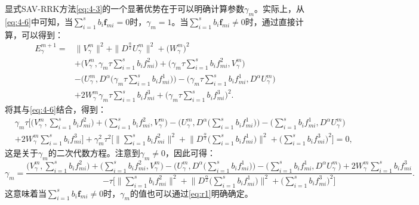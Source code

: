 显式SAV-RRK方法\eqref{eq:4-3}的一个显著优势在于可以明确计算参数$\gamma_m$。实际上，从\eqref{eq:4-6}中可知，当$\sum\limits_{i=1}^s b_i \bm{f}_{m i}=0$时，$\gamma_m=1$。当$\sum\limits_{i=1}^s b_i \bm{f}_{m i}\neq 0$时，通过直接计算，可以得到：
\begin{align}
E_{\gamma}^{m+1}  = & \|V_{\gamma}^{m}\|^2+\|D^\frac{\alpha}{2} U_{\gamma}^{m}\|^2+\big(W_{\gamma}^{m}\big)^2 \nonumber\\
& + \big(V_{\gamma}^{m},\gamma_m\tau\sum\limits_{i=1}^{s}b_if_{mi}^2\big)+\big(\gamma_m\tau\sum\limits_{i=1}^{s}b_if_{mi}^2,V_{\gamma}^{m}\big)\nonumber\\
&-\big(U_{\gamma}^{m}, D^{\alpha}\big(\gamma_m\tau\sum\limits_{i=1}^{s}b_if_{mi}^1\big)\big)-\big(\gamma_m\tau\sum\limits_{i=1}^{s}b_if_{mi}^1, D^{\alpha} U_{\gamma}^{m}\big)\nonumber\\
&+2W_{\gamma}^{m}\gamma_m\tau\sum\limits_{i=1}^{s}b_if_{mi}^3+\big(\gamma_m\tau\sum\limits_{i=1}^{s}b_if_{mi}^3\big)^2.\label{eq:49}
\end{align}
将其与\eqref{eq:4-6}结合，得到：
\begin{align*}
&\gamma_m\tau\big[\big(V_{\gamma}^{m},\sum\limits_{i=1}^{s}b_if_{mi}^2\big)+\big(\sum\limits_{i=1}^{s}b_if_{mi}^2,V_{\gamma}^{m}\big)-\big(U_{\gamma}^{m},D^{\alpha}\big(\sum\limits_{i=1}^{s}b_if_{mi}^1\big)\big)-\big(\sum\limits_{i=1}^{s}b_if_{mi}^1, D^{\alpha} U_{\gamma}^{m}\big)\\
&+2W_{\gamma}^{m}\sum\limits_{i=1}^{s}b_if_{mi}^3\big] +\gamma_m^2\tau^2\big[\big\|\sum\limits_{i=1}^{s}b_if_{mi}^2\big\|^2+ \big\|D^\frac{\alpha}{2}\big(\sum\limits_{i=1}^{s}b_if_{mi}^1\big)\big\|^2+\big(\sum\limits_{i=1}^{s}b_if_{mi}^3\big)^2\big]=0,
\end{align*}
这是关于$\gamma_m$的二次代数方程。注意到$\gamma_m\neq 0$，因此可得：
\begin{equation}\label{eq:r1}
\gamma_m = \frac{\big(V_{\gamma}^{m},\sum\limits_{i=1}^{s}b_if_{mi}^2\big)+\big(\sum\limits_{i=1}^{s}b_if_{mi}^2,V_{\gamma}^{m}\big)-\big(U_{\gamma}^{m},D^{\alpha}\big(\sum\limits_{i=1}^{s}b_if_{mi}^1\big)\big)-\big(\sum\limits_{i=1}^{s}b_if_{mi}^1, D^{\alpha} U_{\gamma}^{m}\big)+2W_{\gamma}^{m}\sum\limits_{i=1}^{s}b_if_{mi}^3}{-\tau\big[\big\|\sum\limits_{i=1}^{s}b_if_{mi}^2\big\|^2+ \big\|D^\frac{\alpha}{2}\big(\sum\limits_{i=1}^{s}b_if_{mi}^1\big)\big\|^2+\big(\sum\limits_{i=1}^{s}b_if_{mi}^3\big)^2\big]} .
\end{equation}
这意味着当$\sum\limits_{i=1}^s b_i \bm{f}_{m i}\neq 0$时，$\gamma_m$的值也可以通过\eqref{eq:r1}明确确定。


